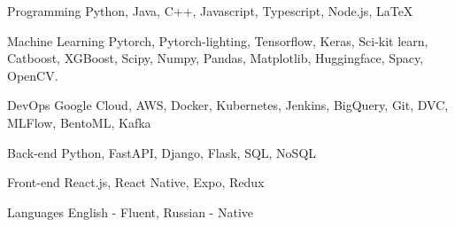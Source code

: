 

\begin{cvskills}

    \cvskill
      {Programming} %
      {Python, Java, C++, Javascript, Typescript, Node.js, LaTeX} %

  \cvskill
    {Machine Learning} %
    {Pytorch, Pytorch-lighting, Tensorflow, Keras, Sci-kit learn, Catboost, XGBoost, Scipy, Numpy, Pandas, Matplotlib, Huggingface, Spacy, OpenCV.} %

  \cvskill
    {DevOps} %
    {Google Cloud, AWS, Docker, Kubernetes, Jenkins, BigQuery, Git, DVC, MLFlow, BentoML, Kafka} %

  \cvskill
    {Back-end} %
    {Python, FastAPI, Django, Flask, SQL, NoSQL} %

  \cvskill
    {Front-end} %
    {React.js, React Native, Expo, Redux} %

  \cvskill
    {Languages} %
    {English - Fluent, Russian - Native} %

\end{cvskills}
